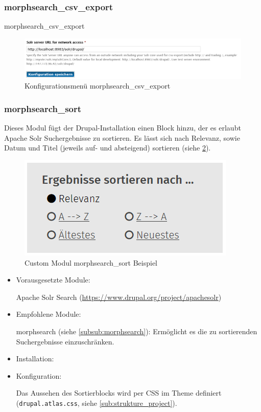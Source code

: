 \subsubsection{morphsearch\_csv\_export}\label{subsub:morphsearchcsv}
morphsearch\_csv\_export
\begin{figure}[H]
	\centering
	\includegraphics[width=0.70\linewidth]{images/config_searchcsv}
	\caption{Konfigurationsmenü morphsearch\_csv\_export}
	\label{fig:config_search}
\end{figure}



\newpage
\subsubsection{morphsearch\_sort}\label{subsub:morphsearchsort}
Dieses Modul fügt der Drupal-Installation einen Block hinzu, der es erlaubt Apache Solr Suchergebnisse zu sortieren. Es lässt sich nach Relevanz, sowie Datum und Titel (jeweils auf- und absteigend) sortieren (siehe \cref{fig:example_morphsearchsort}).


\begin{figure}[H]
	\centering
	\includegraphics[height=0.10\textheight]{images/example_morphsearchsort}
	\caption{Custom Modul morphsearch\_sort Beispiel}
	\label{fig:example_morphsearchsort}
\end{figure}

\begin{itemize}[parsep=0pt, itemsep=5.0pt plus 2.0pt minus 1.0pt, leftmargin=*]
	\item Vorausgesetzte Module:
	
	Apache Solr Search (\url{https://www.drupal.org/project/apachesolr})
	
	
	\item Empfohlene Module:
	
	morphsearch (siehe \cref{subsub:morphsearch}): Ermöglicht es die zu sortierenden Suchergebnisse einzuschränken.
	
	
	\item Installation: \standardinstall
	
	\item Konfiguration:
	
	\noconfig
	
	Das Aussehen des Sortierblocks wird per CSS im Theme definiert (\zB \lstinline|drupal.atlas.css|, siehe \cref{sub:strukture_project}).
	
\end{itemize}


